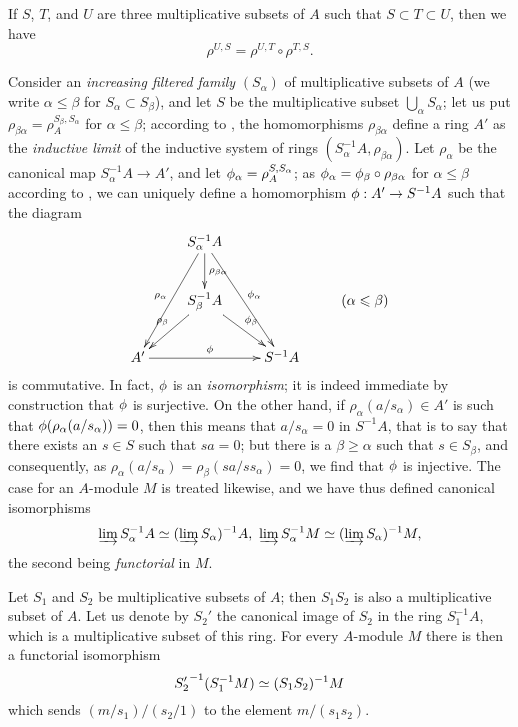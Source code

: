 \begin{env}[1.4.4]
\label{0.1.4.4}
If $S$, $T$, and $U$ are three multiplicative subsets of $A$ such that $S\subset T\subset U$, then we have
\[
  \rho^{U,S}=\rho^{U,T}\circ\rho^{T,S}.
\]
\end{env}

\begin{env}[1.4.5]
\label{0.1.4.5}
Consider an \emph{increasing filtered family} $(S_\alpha)$ of multiplicative
subsets of $A$ (we write $\alpha\leq\beta$ for $S_\alpha\subset S_\beta$),
and let $S$ be the multiplicative subset $\bigcup_\alpha S_\alpha$; let us put
$\rho_{\beta\alpha}=\rho_A^{S_\beta,S_\alpha}$ for $\alpha\leq\beta$;
according to , the homomorphisms $\rho_{\beta\alpha}$ define a
ring $A'$ as the \emph{inductive limit} of the inductive system of rings
$(S_\alpha^{-1}A,\rho_{\beta\alpha})$.
Let $\rho_\alpha$ be the canonical map $S_\alpha^{-1}A\to A'$, and let $\phi_\alpha=\rho_A^{S,S_\alpha}$; as
$\phi_\alpha=\phi_\beta\circ\rho_{\beta\alpha}$ for $\alpha\leq\beta$
according to , we can uniquely define a homomorphism $\vphi:A'\to S^{-1}A$ such that the diagram
\[
  \xymatrix{
    & S_\alpha^{-1}A\ar[ddl]_{\rho_\alpha}\ar[d]^{\rho_{\beta\alpha}}\ar[rdd]^{\vphi_\alpha}\\
    & S_\beta^{-1}A\ar[ld]_{\rho_\beta}\ar[rd]^{\vphi_\beta}
    & & (\alpha\leq\beta)\\
    A'\ar[rr]^\vphi & &
    S^{-1}A
  }
\]
is commutative.
In fact, $\phi$ is an \emph{isomorphism}; it is indeed immediate by construction that $\phi$ is surjective.
On the other hand, if $\rho_\alpha(a/s_\alpha)\in A'$ is such that $\phi(\rho_\alpha(a/s_\alpha))=0$, then this means that $a/s_\alpha=0$ in $S^{-1}A$, that is to say that there exists an $s\in S$ such that $sa=0$; but there is a $\beta\geq\alpha$ such that $s\in S_\beta$, and consequently, as $\rho_\alpha(a/s_\alpha)=\rho_\beta(sa/ss_\alpha)=0$, we find that $\phi$ is injective.
The case for an $A$-module $M$ is treated likewise, and we have thus defined canonical isomorphisms
\[
  \varinjlim S_\alpha^{-1}A\simeq(\varinjlim S_\alpha)^{-1}A,\
  \varinjlim S_\alpha^{-1}M\simeq(\varinjlim S_\alpha)^{-1}M,
\]
the second being \emph{functorial} in $M$.
\end{env}

\begin{env}[1.4.6]
\label{0.1.4.6}
Let $S_1$ and $S_2$ be multiplicative subsets of $A$; then $S_1 S_2$ is also a
multiplicative subset of $A$. Let us denote by $S_2'$ the canonical image of
$S_2$ in the ring $S_1^{-1}A$, which is a multiplicative subset of this ring.
For every $A$-module $M$ there is then a functorial isomorphism
\[
  {S_2'}^{-1}(S_1^{-1}M)\simeq(S_1 S_2)^{-1}M
\]
which sends $(m/s_1)/(s_2/1)$ to the element $m/(s_1 s_2)$.
\end{env}

